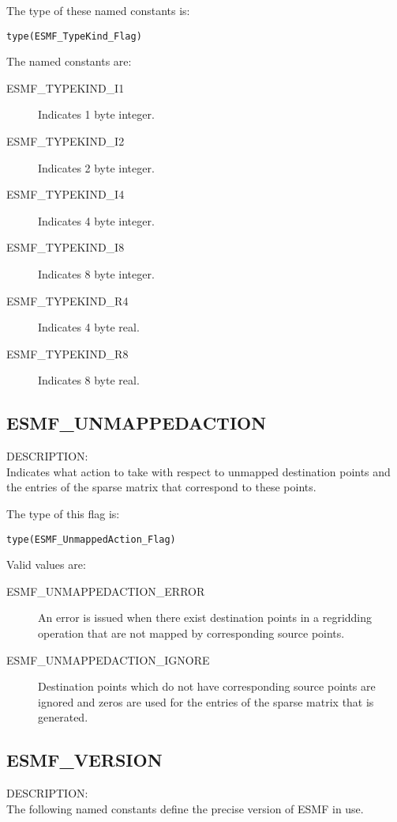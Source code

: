 The type of these named constants is:

{\tt type(ESMF\_TypeKind\_Flag)}

The named constants are:
\begin{description}
\item [ESMF\_TYPEKIND\_I1]
      Indicates 1 byte integer.
\item [ESMF\_TYPEKIND\_I2]
      Indicates 2 byte integer.
\item [ESMF\_TYPEKIND\_I4]
      Indicates 4 byte integer.
\item [ESMF\_TYPEKIND\_I8]
      Indicates 8 byte integer.
\item [ESMF\_TYPEKIND\_R4]
      Indicates 4 byte real.
\item [ESMF\_TYPEKIND\_R8]
      Indicates 8 byte real.
\end{description}

\subsection{ESMF\_UNMAPPEDACTION}
\label{const:unmappedaction}
{\sf DESCRIPTION:\\}
Indicates what action to take with respect to unmapped destination points
and the entries of the sparse matrix that correspond to these points.

The type of this flag is:

{\tt type(ESMF\_UnmappedAction\_Flag)}

Valid values are:
\begin{description}
	\item[ESMF\_UNMAPPEDACTION\_ERROR]
	An error is issued when there exist destination points in a regridding
	operation that are not mapped by corresponding source points.
	\item[ESMF\_UNMAPPEDACTION\_IGNORE]
	Destination points which do not have corresponding source points are 
	ignored and zeros are used for the entries of the sparse matrix
	that is generated.
\end{description}

\subsection{ESMF\_VERSION}
\label{const:version}

{\sf DESCRIPTION:\\}
The following named constants define the precise version of ESMF in use.

